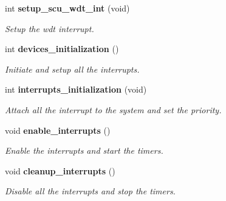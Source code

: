 \begin{DoxyCompactItemize}
int \textbf{ setup\+\_\+scu\+\_\+wdt\+\_\+int} (void)
\begin{DoxyCompactList}\small\item\em Setup the wdt interrupt. \end{DoxyCompactList}\item 
int \textbf{ devices\+\_\+initialization} ()
\begin{DoxyCompactList}\small\item\em Initiate and setup all the interrupts. \end{DoxyCompactList}\item 
int \textbf{ interrupts\+\_\+initialization} (void)
\begin{DoxyCompactList}\small\item\em Attach all the interrupt to the system and set the priority. \end{DoxyCompactList}\item 
void \textbf{ enable\+\_\+interrupts} ()
\begin{DoxyCompactList}\small\item\em Enable the interrupts and start the timers. \end{DoxyCompactList}\item 
void \textbf{ cleanup\+\_\+interrupts} ()
\begin{DoxyCompactList}\small\item\em Disable all the interrupts and stop the timers. \end{DoxyCompactList}\end{DoxyCompactItemize}
